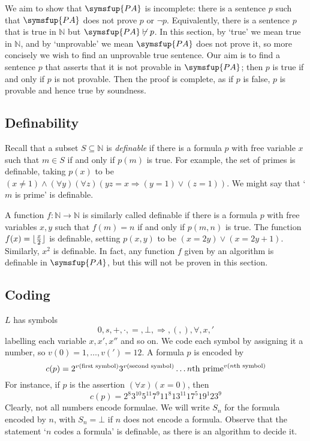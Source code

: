 We aim to show that \( \symsfup{PA} \) is incomplete: there is a sentence \( p \) such that \( \symsfup{PA} \) does not prove \( p \) or \( \neg p \).
Equivalently, there is a sentence \( p \) that is true in \( \mathbb N \) but \( \symsfup{PA} \not\vdash p \).
In this section, by `true' we mean true in \( \mathbb N \), and by `unprovable' we mean \( \symsfup{PA} \) does not prove it, so more concisely we wish to find an unprovable true sentence.
Our aim is to find a sentence \( p \) that asserts that it is not provable in \( \symsfup{PA} \); then \( p \) is true if and only if \( p \) is not provable.
Then the proof is complete, as if \( p \) is false, \( p \) is provable and hence true by soundness.

\subsection{Definability}
Recall that a subset \( S \subseteq \mathbb N \) is \emph{definable} if there is a formula \( p \) with free variable \( x \) such that \( m \in S \) if and only if \( p(m) \) is true.
For example, the set of primes is definable, taking \( p(x) \) to be \( (x \neq 1) \wedge (\forall y)(\forall z)(yz = x \Rightarrow (y = 1) \vee (z = 1)) \).
We might say that `\( m \) is prime' is definable.

A function \( f \colon \mathbb N \to \mathbb N \) is similarly called definable if there is a formula \( p \) with free variables \( x, y \) such that \( f(m) = n \) if and only if \( p(m,n) \) is true.
The function \( f(x) = \lfloor\frac{x}{2}\rfloor \) is definable, setting \( p(x,y) \) to be \( (x = 2y) \vee (x = 2y + 1) \).
Similarly, \( x^2 \) is definable.
In fact, any function \( f \) given by an algorithm is definable in \( \symsfup{PA} \), but this will not be proven in this section.

\subsection{Coding}
\( L \) has symbols
\[ 0, s, +, \cdot, =, \bot, \Rightarrow, (, ), \forall, x, ' \]
labelling each variable \( x, x', x'' \) and so on.
We code each symbol by assigning it a number, so \( v(0) = 1, \dots, v(') = 12 \).
A formula \( p \) is encoded by
\[ c(p) = 2^{v(\text{first symbol})} 3^{v(\text{second symbol})} \dots \text{\( n \)th prime}^{v(\text{\( n \)th symbol})} \]
For instance, if \( p \) is the assertion \( (\forall x)(x=0) \), then
\[ c(p) = 2^8 3^{10} 5^{11} 7^9 11^8 13^{11} 17^5 19^1 23^9 \]
Clearly, not all numbers encode formulae.
We will write \( S_n \) for the formula encoded by \( n \), with \( S_n = \bot \) if \( n \) does not encode a formula.
Observe that the statement `\( n \) codes a formula' is definable, as there is an algorithm to decide it.

